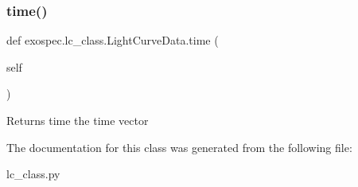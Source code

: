 \subsubsection{\texorpdfstring{time()}{time()}}
{\footnotesize\ttfamily def exospec.\+lc\+\_\+class.\+Light\+Curve\+Data.\+time (\begin{DoxyParamCaption}\item[{}]{self }\end{DoxyParamCaption})}

\begin{DoxyReturn}{Returns}
time the time vector 
\end{DoxyReturn}


The documentation for this class was generated from the following file\+:\begin{DoxyCompactItemize}
\item 
lc\+\_\+class.\+py\end{DoxyCompactItemize}
